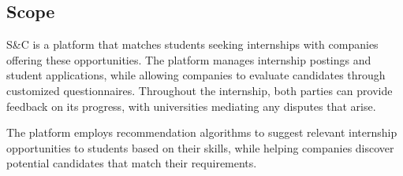 \subsection{Scope}

\par S\&C is a platform that matches students seeking internships with companies offering these opportunities. The
platform manages internship postings and student applications, while allowing companies to evaluate candidates through
customized questionnaires. Throughout the internship, both parties can provide feedback on its progress, with
universities mediating any disputes that arise.

\par The platform employs recommendation algorithms to suggest relevant internship opportunities to students based on
their skills, while helping companies discover potential candidates that match their requirements.

